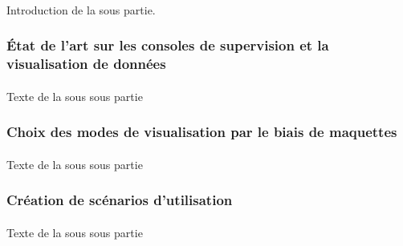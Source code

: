 		\paragraph{}
		Introduction de la sous partie.
		
		\subsubsection{État de l'art sur les consoles de supervision et la visualisation de données}
			\paragraph{}
			Texte de la sous sous partie
		\subsubsection{Choix des modes de visualisation par le biais de maquettes}
			\paragraph{}
			Texte de la sous sous partie
		\subsubsection{Création de scénarios d'utilisation}
			\paragraph{}
			Texte de la sous sous partie
